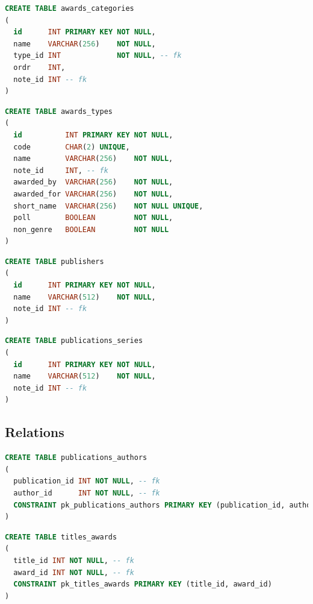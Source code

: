 \documentclass[doubleside, titlepage]{article}
\begin{document}
\begin{lstlisting}[language=SQL,showspaces=false,basicstyle=\ttfamily,numberstyle=\tiny,commentstyle=\color{gray}
        ]
CREATE TABLE awards_categories
(
  id      INT PRIMARY KEY NOT NULL,
  name    VARCHAR(256)    NOT NULL,
  type_id INT             NOT NULL, -- fk
  ordr    INT,
  note_id INT -- fk
)
\end{lstlisting}

\begin{lstlisting}[language=SQL,showspaces=false,basicstyle=\ttfamily,numberstyle=\tiny,commentstyle=\color{gray}
        ]
CREATE TABLE awards_types
(
  id          INT PRIMARY KEY NOT NULL,
  code        CHAR(2) UNIQUE,
  name        VARCHAR(256)    NOT NULL,
  note_id     INT, -- fk
  awarded_by  VARCHAR(256)    NOT NULL,
  awarded_for VARCHAR(256)    NOT NULL,
  short_name  VARCHAR(256)    NOT NULL UNIQUE,
  poll        BOOLEAN         NOT NULL,
  non_genre   BOOLEAN         NOT NULL
)
\end{lstlisting}

\begin{lstlisting}[language=SQL,showspaces=false,basicstyle=\ttfamily,numberstyle=\tiny,commentstyle=\color{gray}
        ]
CREATE TABLE publishers
(
  id      INT PRIMARY KEY NOT NULL,
  name    VARCHAR(512)    NOT NULL,
  note_id INT -- fk
)
\end{lstlisting}

\begin{lstlisting}[language=SQL,showspaces=false,basicstyle=\ttfamily,numberstyle=\tiny,commentstyle=\color{gray}
        ]
CREATE TABLE publications_series
(
  id      INT PRIMARY KEY NOT NULL,
  name    VARCHAR(512)    NOT NULL,
  note_id INT -- fk
)
\end{lstlisting}

\subsection{Relations}

\begin{lstlisting}[language=SQL,showspaces=false,basicstyle=\ttfamily,numberstyle=\tiny,commentstyle=\color{gray}
        ]
CREATE TABLE publications_authors
(
  publication_id INT NOT NULL, -- fk
  author_id      INT NOT NULL, -- fk
  CONSTRAINT pk_publications_authors PRIMARY KEY (publication_id, author_id)
)
\end{lstlisting}

\begin{lstlisting}[language=SQL,showspaces=false,basicstyle=\ttfamily,numberstyle=\tiny,commentstyle=\color{gray}
        ]
CREATE TABLE titles_awards
(
  title_id INT NOT NULL, -- fk
  award_id INT NOT NULL, -- fk
  CONSTRAINT pk_titles_awards PRIMARY KEY (title_id, award_id)
)
\end{lstlisting}
\end{document}
